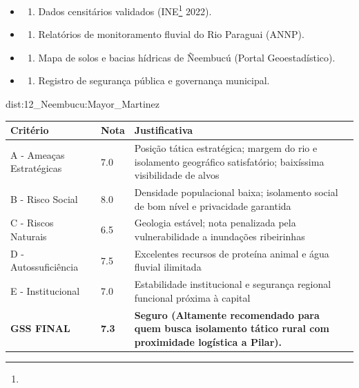 {\begin{itemize}
\tightlist
\item
  \begin{enumerate}
  \def\labelenumi{\arabic{enumi})}
  \tightlist
  \item
    Dados censitários validados (INE\footnote{\fineINE} 2022).
  \end{enumerate}
\item
  \begin{enumerate}
  \def\labelenumi{\arabic{enumi})}
  \setcounter{enumi}{1}
  \tightlist
  \item
    Relatórios de monitoramento fluvial do Rio Paraguai (ANNP).
  \end{enumerate}
\item
  \begin{enumerate}
  \def\labelenumi{\arabic{enumi})}
  \setcounter{enumi}{2}
  \tightlist
  \item
    Mapa de solos e bacias hídricas de Ñeembucú (Portal Geoestadístico).
  \end{enumerate}
\item
  \begin{enumerate}
  \def\labelenumi{\arabic{enumi})}
  \setcounter{enumi}{3}
  \tightlist
  \item
    Registro de segurança pública e governança municipal.
  \end{enumerate}
\end{itemize}}{dist:12_Neembucu:Mayor_Martinez}
\begin{table}[ht!]
\small \begin{tabular}{p{3.0cm}p{0.8cm}p{6.0cm}} \toprule
\textbf{Critério} & \textbf{Nota} & \textbf{Justificativa} \\ \midrule
A - Ameaças Estratégicas & 7.0 & Posição tática estratégica; margem do rio e isolamento geográfico satisfatório; baixíssima visibilidade de alvos \\
B - Risco Social & 8.0 & Densidade populacional baixa; isolamento social de bom nível e privacidade garantida \\
C - Riscos Naturais & 6.5 & Geologia estável; nota penalizada pela vulnerabilidade a inundações ribeirinhas \\
D - Autossuficiência & 7.5 & Excelentes recursos de proteína animal e água fluvial ilimitada \\
E - Institucional & 7.0 & Estabilidade institucional e segurança regional funcional próxima à capital \\
\midrule \textbf{GSS FINAL} & \textbf{7.3} & \textbf{Seguro (Altamente recomendado para quem busca isolamento tático rural com proximidade logística a Pilar).} \\ \bottomrule \end{tabular}
\end{table}
